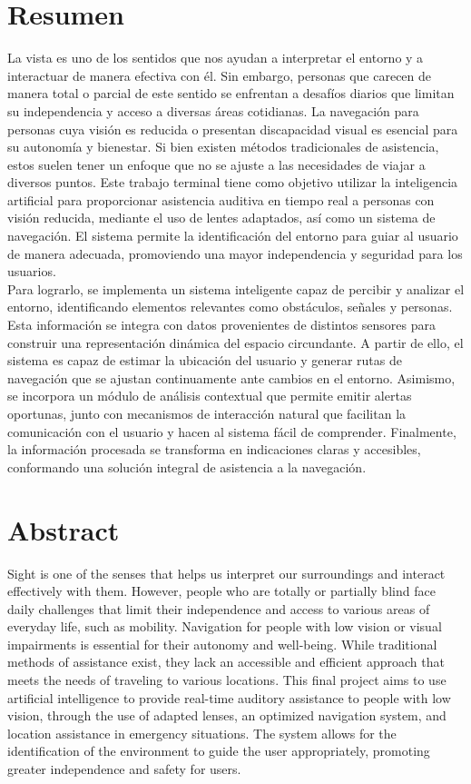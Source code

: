 \chapter*{Resumen}

    La vista es uno de los sentidos que nos ayudan a interpretar el entorno y a interactuar de manera efectiva con él. Sin embargo, personas que carecen de manera total o parcial de este sentido se enfrentan a desafíos diarios que limitan su independencia y acceso a diversas áreas cotidianas. La navegación para personas cuya visión es reducida o presentan discapacidad visual es esencial para su autonomía y bienestar. Si bien existen métodos tradicionales de asistencia, estos suelen tener un enfoque  que no se ajuste a las necesidades de viajar a diversos puntos. Este trabajo terminal tiene como objetivo utilizar la inteligencia artificial para proporcionar asistencia auditiva en tiempo real a personas con visión reducida, mediante el uso de lentes adaptados, así como un sistema de navegación. El sistema permite la identificación del entorno para guiar al usuario de manera adecuada, promoviendo una mayor independencia y seguridad para los usuarios.\\
        
    Para lograrlo, se implementa un sistema inteligente capaz de percibir y analizar el entorno, identificando elementos relevantes como obstáculos, señales y personas. Esta información se integra con datos provenientes de distintos sensores para construir una representación dinámica del espacio circundante. A partir de ello, el sistema es capaz de estimar la ubicación del usuario y generar rutas de navegación que se ajustan continuamente ante cambios en el entorno. Asimismo, se incorpora un módulo de análisis contextual que permite emitir alertas oportunas, junto con mecanismos de interacción natural que facilitan la comunicación con el usuario y hacen al sistema fácil de comprender. Finalmente, la información procesada se transforma en indicaciones claras y accesibles, conformando una solución integral de asistencia a la navegación.
    

\newpage

 \chapter*{Abstract}

    Sight is one of the senses that helps us interpret our surroundings and interact effectively with them. However, people who are totally or partially blind face daily challenges that limit their independence and access to various areas of everyday life, such as mobility. Navigation for people with low vision or visual impairments is essential for their autonomy and well-being. While traditional methods of assistance exist, they lack an accessible and efficient approach that meets the needs of traveling to various locations. This final project aims to use artificial intelligence to provide real-time auditory assistance to people with low vision, through the use of adapted lenses, an optimized navigation system, and location assistance in emergency situations. The system allows for the identification of the environment to guide the user appropriately, promoting greater independence and safety for users.

